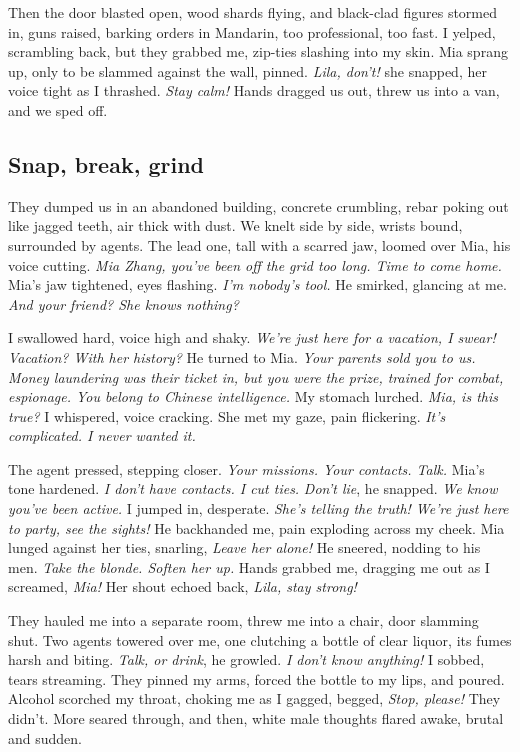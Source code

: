 \documentclass[12pt,oneside]{book}
\begin{document}
Then the door blasted open, wood shards flying, and black-clad figures stormed in, guns raised, barking orders in Mandarin, too professional, too fast. I yelped, scrambling back, but they grabbed me, zip-ties slashing into my skin. Mia sprang up, only to be slammed against the wall, pinned. \textit{Lila, don’t!} she snapped, her voice tight as I thrashed. \textit{Stay calm!} Hands dragged us out, threw us into a van, and we sped off.

\subsection*{Snap, break, grind}

They dumped us in an abandoned building, concrete crumbling, rebar poking out like jagged teeth, air thick with dust. We knelt side by side, wrists bound, surrounded by agents. The lead one, tall with a scarred jaw, loomed over Mia, his voice cutting. \textit{Mia Zhang, you’ve been off the grid too long. Time to come home.} Mia’s jaw tightened, eyes flashing. \textit{I’m nobody’s tool.} He smirked, glancing at me. \textit{And your friend? She knows nothing?}

I swallowed hard, voice high and shaky. \textit{We’re just here for a vacation, I swear!} \textit{Vacation? With her history?} He turned to Mia. \textit{Your parents sold you to us. Money laundering was their ticket in, but you were the prize, trained for combat, espionage. You belong to Chinese intelligence.} My stomach lurched. \textit{Mia, is this true?} I whispered, voice cracking. She met my gaze, pain flickering. \textit{It’s complicated. I never wanted it.}

The agent pressed, stepping closer. \textit{Your missions. Your contacts. Talk.} Mia’s tone hardened. \textit{I don’t have contacts. I cut ties.} \textit{Don’t lie}, he snapped. \textit{We know you’ve been active.} I jumped in, desperate. \textit{She’s telling the truth! We’re just here to party, see the sights!} He backhanded me, pain exploding across my cheek. Mia lunged against her ties, snarling, \textit{Leave her alone!} He sneered, nodding to his men. \textit{Take the blonde. Soften her up.} Hands grabbed me, dragging me out as I screamed, \textit{Mia!} Her shout echoed back, \textit{Lila, stay strong!}

They hauled me into a separate room, threw me into a chair, door slamming shut. Two agents towered over me, one clutching a bottle of clear liquor, its fumes harsh and biting. \textit{Talk, or drink}, he growled. \textit{I don’t know anything!} I sobbed, tears streaming. They pinned my arms, forced the bottle to my lips, and poured. Alcohol scorched my throat, choking me as I gagged, begged, \textit{Stop, please!} They didn’t. More seared through, and then, white male thoughts flared awake, brutal and sudden.
\end{document}
